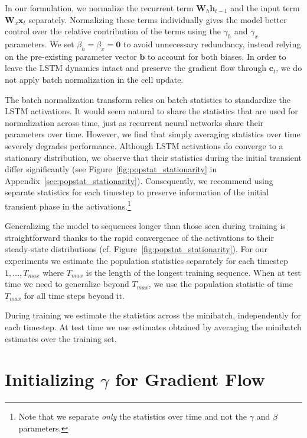 \documentclass{article} %
\newcommand{\vect}[1]{\mathbf{#1}}
\newcommand{\mat}[1]{\mathbf{#1}}
\begin{document}
In our formulation, we normalize the recurrent term $\mat{W}_h \vect{h}_{t-1}$
and the input term $\mat{W}_x \vect{x}_t$ separately.  Normalizing these terms
individually gives the model better control over the relative contribution of
the terms using the $\gamma_h$ and $\gamma_x$ parameters.  We set $\beta_h =
\beta_x = \vect{0}$ to avoid unnecessary redundancy, instead relying on the
pre-existing parameter vector $\vect{b}$ to account for both biases.  In order
to leave the LSTM dynamics intact and preserve the gradient flow through
$\vect{c}_t$, we do not apply batch normalization in the cell update.

The batch normalization transform relies on batch statistics to standardize the
LSTM activations.  It would seem natural to share the statistics that are used
for normalization across time, just as recurrent neural networks share their
parameters over time.  However, we find that simply averaging statistics over
time severely degrades performance.  Although LSTM activations do converge to a
stationary distribution, we observe that their statistics during the initial
transient differ significantly (see Figure~\ref{fig:popstat_stationarity} in Appendix~\ref{sec:popstat_stationarity}).
Consequently, we recommend using separate statistics for each timestep to
preserve information of the initial transient phase in the
activations.\footnote{ Note that we separate \emph{only} the statistics over
time and not the $\gamma$ and $\beta$ parameters.}

Generalizing the model to sequences longer than those seen during training is
straightforward thanks to the rapid convergence of the activations to their
steady-state distributions (cf. Figure~\ref{fig:popstat_stationarity}).  For
our experiments we estimate the population statistics separately for each
timestep $1, \ldots, T_{max}$ where $T_{max}$ is the length of the longest
training sequence.  When at test time we need to generalize beyond $T_{max}$,
we use the population statistic of time $T_{max}$ for all time steps beyond it.

During training we estimate the statistics across the minibatch, independently
for each timestep.  At test time we use estimates obtained by averaging the
minibatch estimates over the training set.


\section{Initializing $\gamma$ for Gradient Flow}
\label{sec:activation-variance}
\end{document}
